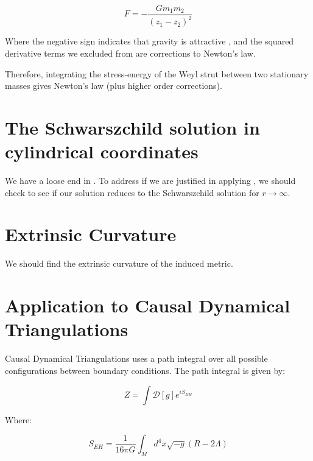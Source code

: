 \documentclass{article}
\begin{document}
\begin{equation}
F=-\frac{Gm_{1}m_{2}}{\left(z_{1}-z_{2}\right)^{2}}
\end{equation}

Where the negative sign indicates that gravity is attractive \cite{carroll2003spacetime}, and the squared derivative terms we excluded from  are corrections to Newton's law.

Therefore, integrating the stress-energy of the Weyl strut between two stationary masses gives Newton's law (plus higher order corrections).

\section{The Schwarszchild solution in cylindrical coordinates}
\label{sec:schwarszchild}

We have a loose end in . To address if we are justified in applying , we should check to see if our solution reduces to the Schwarszchild solution for $r\rightarrow\infty$.

\section{Extrinsic Curvature}

We should find the extrinsic curvature of the induced metric.

\section{Application to Causal Dynamical Triangulations}

Causal Dynamical Triangulations uses a path integral over all possible
configurations between boundary conditions. The path integral is given
by:

\begin{equation}
  \label{eq:path-integral}
Z=\int \mathcal{D}[g]e^{iS_ {EH}}
\end{equation}

Where:

\begin{equation}
  \label{eq:einstein-hilbert-action}
  S_{EH}=\frac{1}{16\pi G}\int_{M}d^4 x\sqrt{-g}\left(R-2\Lambda\right)
\end{equation}




\end{document}
